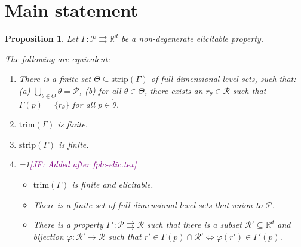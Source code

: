 \documentclass[12pt]{article}
\newcommand{\Comments}{1}
\newcommand{\mynote}[2]{\ifnum\Comments=1\textcolor{#1}{#2}\fi}
\newcommand{\jessie}[1]{\mynote{purple}{[JF: #1]}}
\newcommand{\reals}{\mathbb{R}}
\renewcommand{\P}{\mathcal{P}}
\newcommand{\R}{\mathcal{R}}
\newcommand{\inter}[1]{\mathring{#1}}%
\newcommand{\toto}{\rightrightarrows}
\newcommand{\trim}{\mathrm{trim}}
\newcommand{\strip}{\mathrm{strip}}
\newtheorem{proposition}{Proposition}
\begin{document}
%
%
%
%
%




\section{Main statement}


\begin{proposition}\label{prop:optimal-reports-per-level-set}
  Let $\Gamma:\P\toto\reals^d$ be a non-degenerate elicitable property.

  The following are equivalent:
  \begin{enumerate}
  \item There is a finite set $\Theta \subseteq \strip(\Gamma)$ of full-dimensional level sets, such that: (a) $\bigcup_{\theta\in\Theta} \theta = \P$, (b) for all $\theta \in \Theta$, there exists an $r_\theta \in \R$ such that $\Gamma(p) = \{r_\theta\}$ for all $p \in \inter{\theta}$.
  \item $\trim(\Gamma)$ is finite.
  \item $\strip(\Gamma)$ is finite.
  \item \jessie{Added after fplc-elic.tex}
	\begin{itemize}
		\item[4.] $\trim(\Gamma)$ is finite and elicitable.
		\item[5.] There is a finite set of full dimensional level sets that union to $\P$.
		\item[6.] There is a property $\Gamma': \P \toto \R$ such that there is a subset $\R'\subseteq\reals^d$ and bijection $\varphi:\R'\to\R$ such that $r'\in\Gamma(p) \cap \R' \iff \varphi(r') \in \Gamma'(p)$.
	\end{itemize}
  \end{enumerate}
\end{proposition}
\end{document}
